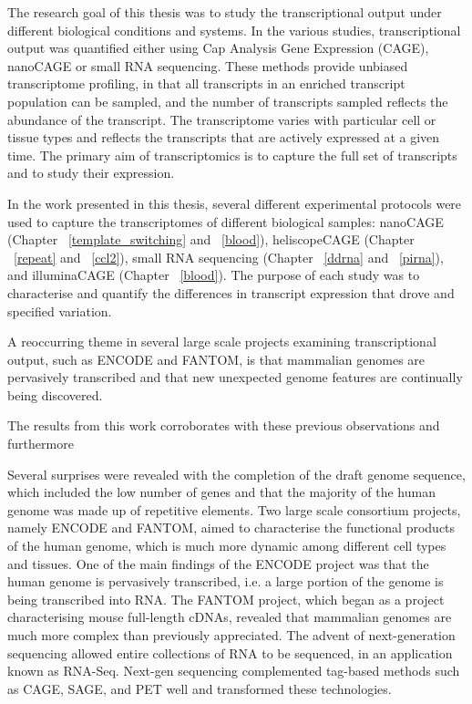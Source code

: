 The research goal of this thesis was to study the transcriptional output under different biological conditions and systems. In the various studies, transcriptional output was quantified either using Cap Analysis Gene Expression (CAGE), nanoCAGE or small RNA sequencing. These methods provide unbiased transcriptome profiling, in that all transcripts in an enriched transcript population can be sampled, and the number of transcripts sampled reflects the abundance of the transcript. The transcriptome varies with particular cell or tissue types and reflects the transcripts that are actively expressed at a given time. The primary aim of transcriptomics is to capture the full set of transcripts and to study their expression.

In the work presented in this thesis, several different experimental protocols were used to capture the transcriptomes of different biological samples: nanoCAGE\cite{pmid20543846} (Chapter ~\ref{template_switching} and ~\ref{blood}), heliscopeCAGE\cite{pmid21596820} (Chapter ~\ref{repeat} and ~\ref{ccl2}), small RNA sequencing\cite{pmid20964636} (Chapter ~\ref{ddrna} and ~\ref{pirna}), and illuminaCAGE\cite{Takahashi2012} (Chapter ~\ref{blood}). The purpose of each study was to characterise and quantify the differences in transcript expression that drove and specified variation.

A reoccurring theme in several large scale projects examining transcriptional output, such as ENCODE and FANTOM, is that mammalian genomes are pervasively transcribed and that new unexpected genome features are continually being discovered. 

The results from this work corroborates with these previous observations and furthermore 

Several surprises were revealed with the completion of the draft genome sequence, which included the low number of genes and that the majority of the human genome was made up of repetitive elements. Two large scale consortium projects, namely ENCODE and FANTOM,  aimed to characterise the functional products of the human genome, which is much more dynamic among different cell types and tissues. One of the main findings of the ENCODE project was that the human genome is pervasively transcribed, i.e. a large portion of the genome is being transcribed into RNA. The FANTOM project, which began as a project characterising mouse full-length cDNAs, revealed that mammalian genomes are much more complex than previously appreciated. The advent of next-generation sequencing allowed entire collections of RNA to be sequenced, in an application known as RNA-Seq. Next-gen sequencing complemented tag-based methods such as CAGE, SAGE, and PET well and transformed these technologies.

